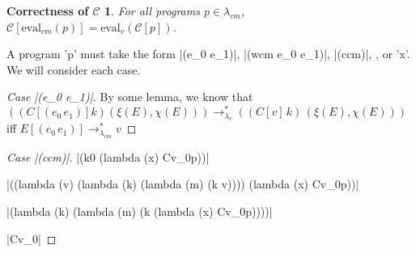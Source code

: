 \documentclass[ms,electronic,twosidetoc,letterpaper,chaptercenter,parttop]{byumsphd}
\begin{document}
\newtheorem*{maintheorem}{Correctness of $\mathcal{C}$}
\begin{maintheorem}
For all programs $p\in\lambda_{cm}$, $\mathcal{C}[\mathrm{eval}_{cm}(p)]=\mathrm{eval}_{v}(\mathcal{C}[p])$.
\end{maintheorem}
A program \scheme'p' must take the form \scheme|(e_0 e_1)|, \scheme|(wcm e_0 e_1)|, \scheme|(ccm)|, , or \scheme'x'. We will consider each case.







\begin{proof}[Case \scheme|(e_0 e_1)|]




By some lemma, we know that $((C[(e_0\,e_1)] k) (\xi(E),\chi(E)))\rightarrow_{\lambda_{v}}^{*}((C[v]\,k)\,(\xi(E),\chi(E)))$ iff $E[(e_0\,e_1)]\rightarrow_{\lambda_{cm}}^{*}v$
\end{proof}

\begin{proof}[Case \scheme|(ccm)|]


% 


\scheme|(k0 (lambda (x) Cv_0p))|

\scheme|((lambda (v) (lambda (k) (lambda (m) (k v)))) (lambda (x) Cv_0p))|

\scheme|(lambda (k) (lambda (m) (k (lambda (x) Cv_0p))))|

\scheme|Cv_0|
\end{proof}
\end{document}
